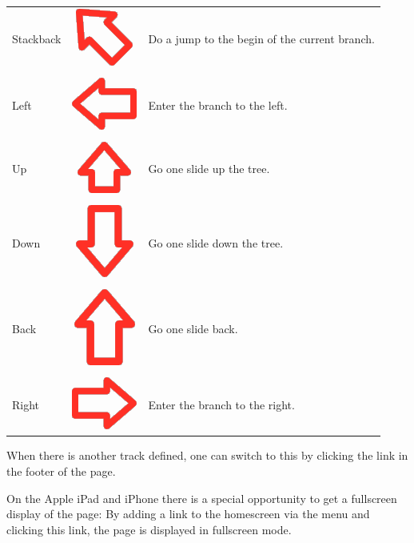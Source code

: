 \begin{table}[htbp]
	\centering
		\begin{tabular}{lcl}
			Stackback & \includegraphics[scale=0.05]{images/arrow_stackback_active.png} & Do a jump to the begin of the current branch.\\
			\\
			Left & \includegraphics[scale=0.05]{images/arrow_left_active.png} & Enter the branch to the left.\\
	\\
			Up & \includegraphics[scale=0.05]{images/arrow_up_active.png} & Go one slide up the tree.\\
	\\
			Down & \includegraphics[scale=0.05]{images/arrow_down_active.png} & Go one slide down the tree.\\
	\\
			Back & \includegraphics[scale=0.05]{images/arrow_back_active.png} & Go one slide back.\\
	\\
			Right & \includegraphics[scale=0.05]{images/arrow_right_active.png} & Enter the branch to the right.\\
		\end{tabular}
\end{table}

When there is another track defined, one can switch to this by clicking the link in the footer of the page.

On the Apple iPad and iPhone there is a special opportunity to get a fullscreen display of the page: 
By adding a link to the homescreen via the menu and clicking this link, the page is displayed in fullscreen mode.